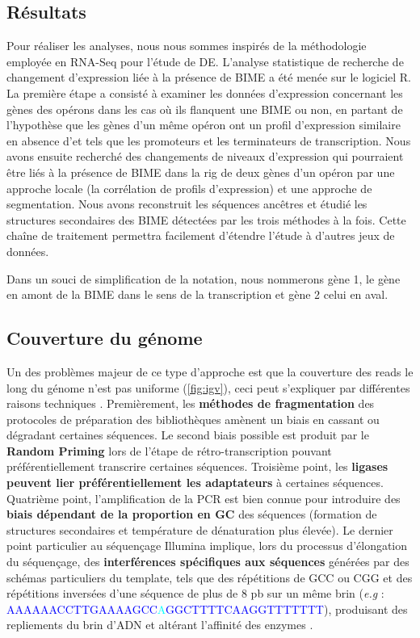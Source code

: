 \documentclass[12pt,a4paper]{report}
\begin{document}
\begin{onehalfspace}
\chapter*{Résultats}

Pour réaliser les analyses, nous nous sommes inspirés de la méthodologie employée en RNA-Seq pour l'étude de DE. L'analyse statistique de recherche de changement d'expression liée à la présence de BIME a été menée sur le logiciel R. La première étape a consisté à examiner les données d'expression concernant les gènes des opérons dans les cas où ils flanquent une BIME ou non, en partant de l'hypothèse que les gènes d'un même opéron ont un profil d'expression similaire en absence d'\gls{et} tels que les promoteurs et les terminateurs de transcription. Nous avons ensuite recherché des changements de niveaux d'expression qui pourraient être liés à la présence de BIME dans la \gls{rig} de deux gènes d'un opéron par une approche locale (la corrélation de profils d'expression) et une approche de segmentation. Nous avons reconstruit les séquences ancêtres et étudié les structures secondaires des BIME détectées par les trois méthodes à la fois. Cette chaîne de traitement permettra facilement d'étendre l'étude à d'autres jeux de données.

Dans un souci de simplification de la notation, nous nommerons gène 1, le gène en amont de la BIME dans le sens de la transcription et gène 2 celui en aval.

\section*{Couverture du génome}
\label{uniformite_couverture}

Un des problèmes majeur de ce type d'approche est que la couverture des reads le long du génome n'est pas uniforme (\autoref{fig:igv}), ceci peut s'expliquer par différentes raisons techniques \citep{Li2013}. Premièrement, les \textbf{méthodes de fragmentation} des protocoles de préparation des bibliothèques amènent un biais en cassant ou dégradant certaines séquences. Le second biais possible est produit par le \textbf{Random Priming} lors de l'étape de rétro-transcription pouvant préférentiellement transcrire certaines séquences. Troisième point, les \textbf{ligases peuvent lier préférentiellement les adaptateurs} à certaines séquences. Quatrième point, l'amplification de la PCR est bien connue pour introduire des \textbf{biais dépendant de la proportion en GC} des séquences (formation de structures secondaires et température de dénaturation plus élevée). Le dernier point particulier au séquençage Illumina implique, lors du processus d'élongation du séquençage, des \textbf{interférences spécifiques aux séquences} générées par des schémas particuliers du template, tels que des répétitions de GCC ou CGG et des répétitions inversées d'une séquence de plus de 8 pb sur un même brin (\textit{e.g} : \textcolor{blue}{AAAAAACCTTGAAAAGCC}\textcolor{cyan}{A}\textcolor{blue}{GGCTTTTCAAGGTTTTTTT}), produisant des repliements du brin d'ADN et altérant l'affinité des enzymes \citep{Nakamura2011}. 


\end{onehalfspace}
\end{document}

